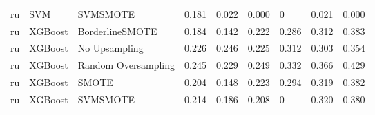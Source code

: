 \begin{tabular}{lllllllll}
      ru &                          SVM &            SVMSMOTE & 0.181 &                     0.022 &                 0.000 &                      0 &                                   0.021 &     0.000 \\
      ru &                      XGBoost &     BorderlineSMOTE & 0.184 &                     0.142 &                 0.222 &                  0.286 &                                   0.312 &     0.383 \\
      ru &                      XGBoost &       No Upsampling & 0.226 &                     0.246 &                 0.225 &                  0.312 &                                   0.303 &     0.354 \\
      ru &                      XGBoost & Random Oversampling & 0.245 &                     0.229 &                 0.249 &                  0.332 &                                   0.366 &     0.429 \\
      ru &                      XGBoost &               SMOTE & 0.204 &                     0.148 &                 0.223 &                  0.294 &                                   0.319 &     0.382 \\
      ru &                      XGBoost &            SVMSMOTE & 0.214 &                     0.186 &                 0.208 &                      0 &                                   0.320 &     0.380 \\
\bottomrule
\end{tabular}
